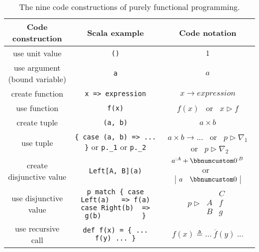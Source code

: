 \begin{table}
\begin{centering}
\begin{tabular}{|c|c|c|}
\hline 
\textbf{\small{}Code construction} & \textbf{\small{}Scala example} & \textbf{\small{}Code notation}\tabularnewline
\hline 
\hline 
{\small{}use unit value} & {\small{}}\lstinline!()! & {\small{}$1$}\tabularnewline
\hline 
{\small{}use argument (bound variable)} & {\small{}}\lstinline!a! & {\small{}$a$}\tabularnewline
\hline 
{\small{}create function} & {\small{}}\lstinline!x => expression! & {\small{}$x\rightarrow expression$}\tabularnewline
\hline 
{\small{}use function} & {\small{}}\lstinline!f(x)! & $f(x)$ ~or~ $x\triangleright f$\tabularnewline
\hline 
{\small{}create tuple} & {\small{}}\lstinline!(a, b)! & {\small{}$a\times b$}\tabularnewline
\hline 
{\small{}use tuple} & {\small{}}\lstinline!{ case (a, b) => ... }!{\small{} or }\lstinline!p._1!{\small{}
or }\lstinline!p._2!{\small{} } & {\small{}$a\times b\rightarrow...$ ~or~ $p\triangleright\nabla_{1}$
~or~ $p\triangleright\nabla_{2}$}\tabularnewline
\hline 
{\small{}create disjunctive value} & {\small{}}\lstinline!Left[A, B](a)! & {\small{}}%
\begin{minipage}[c]{0.2\columnwidth}%
{\small{}\vspace{0.2\baselineskip}
$a^{:A}+\bbnum 0^{:B}$ ~or~~ $\begin{array}{|cc|}
a & \bbnum 0\end{array}$\vspace{0.2\baselineskip}
}%
\end{minipage}\tabularnewline
\hline 
{\small{}use disjunctive value} & {\small{}}%
\begin{minipage}[c]{0.33\columnwidth}%
{\small{}}\lstinline!p match { case Left(a)   => f(a)            case Right(b)  => g(b)          }!%
\end{minipage} & {\small{}}%
\begin{minipage}[c]{0.2\columnwidth}%
{\small{}\vspace{0.2\baselineskip}
$p\triangleright\,\begin{array}{|c||c|}
 & C\\
\hline A & f\\
B & g
\end{array}$\vspace{0.2\baselineskip}
}%
\end{minipage}\tabularnewline
\hline 
{\small{}use recursive call} & {\small{}}\lstinline!def f(x) = { ... f(y) ... }! & {\small{}$f(x)\triangleq...~\overline{f}(y)~...$}\tabularnewline
\hline 
\end{tabular}
\par\end{centering}
\caption{The nine code constructions of purely functional programming.\label{tab:nine-pure-code-constructions}}
\end{table}

